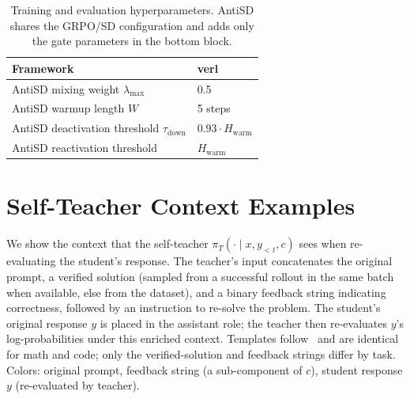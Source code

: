 \documentclass{llmxive}
\begin{document}
\begin{table}[!htbp]
\begin{tabular}{ll}
    Framework                                            & verl~\citep{sheng2025hybridflow}                          \\
    \midrule
    AntiSD mixing weight $\lambda_{\max}$                & 0.5                                                       \\
    AntiSD warmup length $W$                             & 5 steps                                                   \\
    AntiSD deactivation threshold $\tau_{\mathrm{down}}$ & $0.93 \cdot H_{\mathrm{warm}}$                            \\
    AntiSD reactivation threshold                        & $H_{\mathrm{warm}}$                                       \\
    \bottomrule
  \end{tabular}
\caption{Training and evaluation hyperparameters. AntiSD shares the GRPO/SD configuration and adds only the gate parameters in the bottom block.}
\label{tab:hparams}
\end{table}

\section{Self-Teacher Context Examples}
\label{app:prompts}


We show the context that the self-teacher $\pi_T(\cdot \mid x, y_{<t}, c)$ sees when re-evaluating the student's response. The teacher's input concatenates the original prompt, a verified solution (sampled from a successful rollout in the same batch when available, else from the dataset), and a binary feedback string indicating correctness, followed by an instruction to re-solve the problem. The student's original response $y$ is placed in the assistant role; the teacher then re-evaluates $y$'s log-probabilities under this enriched context. Templates follow~\citep{sdpo,opsd} and are identical for math and code; only the verified-solution and feedback strings differ by task. Colors: {original prompt}, {feedback string} (a sub-component of $c$), {student response $y$ (re-evaluated by teacher)}.
\end{document}
